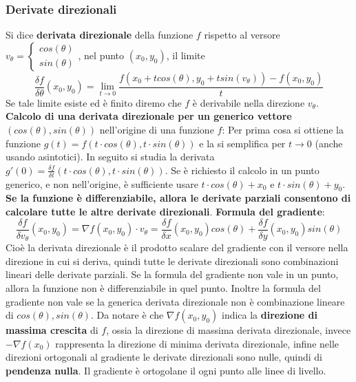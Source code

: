 \subsubsection{Derivate direzionali}
Si dice \textbf{derivata direzionale} della funzione $f$ rispetto al versore $v_\theta = \begin{cases}
    cos(\theta)\\ sin(\theta)
\end{cases}$, nel punto $(x_0,y_0)$, il limite
\[
    \frac{\delta f}{\delta \theta}(x_0,y_0) = \lim_{t\rightarrow 0}\frac{f(x_0 + t cos(\theta), y_0 + t sin(v_\theta)) - f(x_0,y_0)}{t}
\]
Se tale limite esiste ed è finito diremo che $f$ è derivabile nella direzione $v_\theta$.\newline
\newline
\textbf{Calcolo di una derivata direzionale per un generico vettore} $(cos(\theta), sin(\theta))$ nell'origine di una funzione $f$: Per prima cosa si ottiene la funzione $g(t) = f(t \cdot cos(\theta), t \cdot sin(\theta))$ e la si semplifica per $t \rightarrow 0$ (anche usando asintotici). In seguito si studia la derivata $g'(0) = \frac{\delta f}{\delta t}(t \cdot cos(\theta), t \cdot sin(\theta))$.\newline
Se è richiesto il calcolo in un punto generico, e non nell'origine, è sufficiente usare $t \cdot cos(\theta) + x_0$ e $t \cdot sin(\theta) + y_0$. \newline
\newline
\textbf{Se la funzione è differenziabile, allora le derivate parziali consentono di calcolare tutte le altre derivate direzionali}.\newline
\newline
\textbf{Formula del gradiente}: 
\[
    \frac{\delta f}{\delta v_\theta}(x_0,y_0) = \nabla f(x_0,y_0) \cdot v_\theta = \frac{\delta f}{\delta x} (x_0,y_0)cos(\theta) + \frac{\delta f}{\delta y}(x_0, y_0) sin(\theta)
\]
Cioè la derivata direzionale è il prodotto scalare del gradiente con il versore nella direzione in cui si deriva, quindi tutte le derivate direzionali sono combinazioni lineari delle derivate parziali.\newline
Se la formula del gradiente non vale in un punto, allora la funzione non è differenziabile in quel punto.\newline
Inoltre la formula del gradiente non vale se la generica derivata direzionale non è combinazione lineare di $cos(\theta), sin(\theta)$.\newline
\newline
Da notare è che $\nabla f(x_0,y_0)$ indica la \textbf{direzione di massima crescita} di $f$, ossia la direzione di massima derivata direzionale, invece $-\nabla f(x_0)$ rappresenta la direzione di minima derivata direzionale, infine nelle direzioni ortogonali al gradiente le derivate direzionali sono nulle, quindi di \textbf{pendenza nulla}.\newline
\newline
Il gradiente è ortogolane il ogni punto alle linee di livello.
